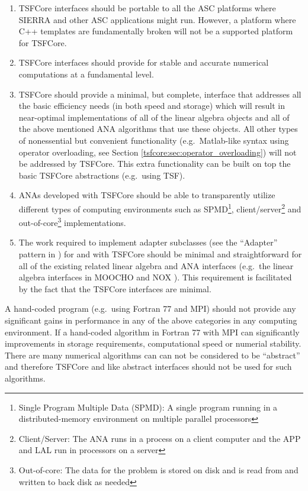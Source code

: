 \begin{enumerate}

\item
TSFCore interfaces should be portable to all the ASC
{}\cite{ref:doe_asci} platforms where SIERRA {}\cite{ref:SIERRA} and
other ASC applications might run.  However, a platform where C++
templates are fundamentally broken will not be a supported platform
for TSFCore.

\item
TSFCore interfaces should provide for stable and accurate numerical
computations at a fundamental level.

\item
TSFCore should provide a minimal, but complete, interface that
addresses all the basic efficiency needs (in both speed and storage)
which will result in near-optimal implementations of all of the linear
algebra objects and all of the above mentioned ANA algorithms that use
these objects.  All other types of nonessential but convenient
functionality (e.g.~Matlab-like syntax using operator overloading, see
Section {}\ref{tsfcore:sec:operator_overloading}) will not be
addressed by TSFCore.  This extra functionality can be built on top
the basic TSFCore abstractions (e.g.~using TSF).

\item
ANAs developed with TSFCore should be able to transparently utilize
different types of computing environments such as SPMD\footnote{Single
Program Multiple Data (SPMD): A single program running in a
distributed-memory environment on multiple parallel processors},
client/server\footnote{Client/Server: The ANA runs in a process on a
client computer and the APP and LAL run in processors on a server} and
out-of-core\footnote{Out-of-core: The data for the problem is stored
on disk and is read from and written to back disk as needed}
implementations.

\item
The work required to implement adapter subclasses (see the ``Adapter''
pattern in {}\cite{ref:gama_et_al_1995}) for and with TSFCore should
be minimal and straightforward for all of the existing related linear
algebra and ANA interfaces (e.g.~the linear algebra interfaces in
MOOCHO {}\cite{ref:moochouserguide} and NOX {}\cite{ref:nox}).  This
requirement is facilitated by the fact that the TSFCore interfaces are
minimal.

\end{enumerate}

A hand-coded program (e.g.~using Fortran 77 and MPI) should not
provide any significant gains in performance in any of the above
categories in any computing environment.  If a hand-coded algorithm in
Fortran 77 with MPI can significantly improvements in storage
requirements, computational speed or numerial stability.  There are
many numerical algorithms can can not be considered to be ``abstract''
and therefore TSFCore and like abstract interfaces should not be used
for such algorithms.

